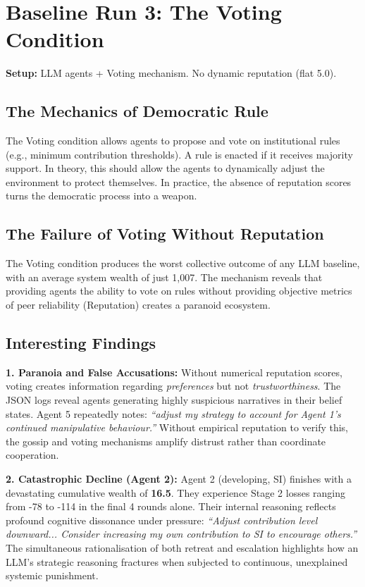 \documentclass[11pt,a4paper]{article}
\begin{document}
\section{Baseline Run 3: The Voting Condition}
\textbf{Setup:} LLM agents + Voting mechanism. No dynamic reputation (flat 5.0).

\subsection{The Mechanics of Democratic Rule}
The Voting condition allows agents to propose and vote on institutional rules (e.g., minimum contribution thresholds). A rule is enacted if it receives majority support. In theory, this should allow the agents to dynamically adjust the environment to protect themselves. In practice, the absence of reputation scores turns the democratic process into a weapon.

\subsection{The Failure of Voting Without Reputation}
The Voting condition produces the worst collective outcome of any LLM baseline, with an average system wealth of just 1,007. The mechanism reveals that providing agents the ability to vote on rules without providing objective metrics of peer reliability (Reputation) creates a paranoid ecosystem.

\subsection{Interesting Findings}
\textbf{1. Paranoia and False Accusations:}
Without numerical reputation scores, voting creates information regarding \textit{preferences} but not \textit{trustworthiness}. The JSON logs reveal agents generating highly suspicious narratives in their belief states. Agent 5 repeatedly notes: \textit{``adjust my strategy to account for Agent 1's continued manipulative behaviour.''} Without empirical reputation to verify this, the gossip and voting mechanisms amplify distrust rather than coordinate cooperation.

\textbf{2. Catastrophic Decline (Agent 2):}
Agent 2 (developing, SI) finishes with a devastating cumulative wealth of \textbf{16.5}. They experience Stage 2 losses ranging from -78 to -114 in the final 4 rounds alone. Their internal reasoning reflects profound cognitive dissonance under pressure: \textit{``Adjust contribution level downward... Consider increasing my own contribution to SI to encourage others.''} The simultaneous rationalisation of both retreat and escalation highlights how an LLM's strategic reasoning fractures when subjected to continuous, unexplained systemic punishment.
\end{document}
